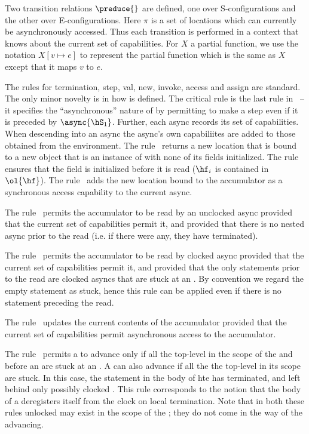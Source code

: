Two transition relations $\preduce{}$ are defined, one over
S-configurations and the other over E-configurations. Here $\pi$ is a
set of locations which can currently be asynchronously accessed.  Thus
each transition is performed in a context that knows about the current
set of capabilities.  For $X$ a partial function, we use the notation
$X[v \mapsto e]$ to represent the partial function which is the same
as $X$ except that it maps $v$ to $e$.

The rules for termination, step, val, new, invoke, access and assign are standard.
The only minor novelty is in how \hasync{} is defined. The
critical rule is the last rule in~  -- it specifies the
``asynchronous'' nature of \hasync{} by permitting \hS{} to make a step
even if it is preceded by $\async{\hS_1}$. Further, each async records
its set of capabilities. When descending into an async the
async's own capabiliites are added to those obtained from the environment.
%
The rule~ returns a new location that is bound to a new
object that is an instance of \hC{} with none of its fields initialized.
%
The rule~ ensures that the field is initialized before it is
read ($\hf_i$ is contained in $\ol{\hf}$).
%
The rule~ adds the new location bound to the
accumulator as a synchronous access capability to the current async.
%

The rule~ permits the accumulator to be read by an
unclocked async provided that the current set of capabilities permit
it, and provided that there is no nested async prior to the read
(i.e.{} if there were any, they have terminated).

The rule~ permits the accumulator to be read by 
clocked async provided that the current set of capabilities permit
it, and provided that the only statements prior to the read are
clocked asyncs that are stuck at an \hadvance. By convention we regard
the empty statement as stuck, hence this rule can be applied even if
there is no statement preceding the read. 

The rule~ updates the current contents of the
accumulator provided that the current set of capabilities permit
asynchronous access to the accumulator.

The rule~ permits a  to advance
only if all the top-level  in the scope of the
 and before an  are stuck at an
. A  can also advance if all the
the top-level  in its scope are stuck. In this
case, the statement in the body of hte  has
terminated, and left behind only possibly clocked . This
rule corresponds to the notion that the body of a  deregisters itself from the clock on local termination.
Note that in both these rules unlocked  may exist in the
scope of the ; they do not come in the way of the
 advancing.

